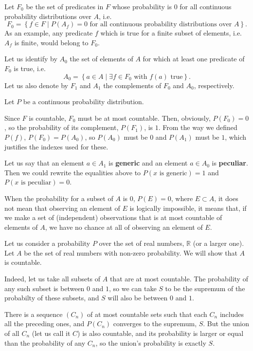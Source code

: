 \documentclass[a4paper
,draft
]{article}
\def\reale{\mathbb{R}}
\newcommand{\multime}[1]{\left\{ #1 \right\}}
\newcommand{\definitie}[1]{\textbf{#1}}
\begin{document}
Let $F_0$ be the set of predicates in $F$ whose probability is
$0$ for all continuous probability distributions over $A$, i.e.
$$F_0=\multime{
  f\in F
  \mid P(A_f)=0
    \mbox{ for all continuous probability distributions over } A}.
$$
As an example, any predicate $f$ which is true for a finite subset of elements,
i.e. $A_f$ is finite, would belong to $F_0$.

Let us identify by $A_0$ the
set of elements of $A$ for which at least one predicate of $F_0$ is true, i.e.
$$A_0=\multime{a \in A\mid \exists f\in F_0 \mbox{ with } f(a)\mbox{ true} }.$$
Let us also denote by $F_1$ and $A_1$ the complements of $F_0$ and $A_0$,
respectively.

Let $P$ be a continuous probability distribution.

Since $F$ is countable, $F_0$ must be at most countable. Then,
obviously, $P(F_0)=0$, so the probability of its complement, $P(F_1)$, is $1$.
From the way we defined $P(f)$, $P(F_0) = P(A_0)$, so $P(A_0)$ must be $0$
and $P(A_1)$ must be $1$, which justifies the indexes used for
these.

Let us say that an element $a\in A_1$ is \definitie{generic}
and an element $a\in A_0$ is \definitie{peculiar}. Then we could rewrite
the equalities above to $P(x\mbox{ is generic}) = 1$ and
$P(x\mbox{ is peculiar}) = 0$.

When the probability for a subset of $A$ is $0$, $P(E)=0$, where $E\subset A$,
it does not mean that observing an element of $E$ is logically impossible,
it means that,
if we make a set of (independent) observations that is at most countable
of elements of $A$, we have no chance at all of observing an element of $E$.

Let us consider a probability $P$ over the set of real numbers, $\reale$ (or
a larger one). Let $A$ be the set of real numbers with non-zero probability.
We will show that $A$ is countable.

Indeed, let us take all subsets of $A$ that are at most countable. The
probability of any such subset is between $0$ and $1$, so we can take
$S$ to be the supremum of the probabilty of these subsets, and
$S$ will also be between $0$ and $1$.

There is a sequence $(C_n)$ of at most countable sets such that each $C_n$
includes all the preceding ones, and $P(C_n)$ converges to the supremum, $S$.
But the union of all $C_n$ (let us call it $C$) is also countable,
and its probability is larger or equal than the probability of any $C_n$,
so the union's probability is exactly $S$.
\end{document}
